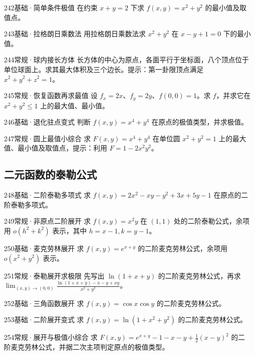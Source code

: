 \begin{exercise}{242}{基础·简单条件极值}
在约束 $x+y=2$ 下求 $f(x,y)=x^2+y^2$ 的最小值及取值点。
\end{exercise}
\begin{exercise}{243}{基础·拉格朗日乘数法}
用拉格朗日乘数法求 $x^2+y^2$ 在 $x-y+1=0$ 下的最小值。
\end{exercise}
\begin{exercise}{244}{常规·球内接长方体}
长方体的中心为原点，各面平行于坐标面，八个顶点位于单位球面上。求其最大体积及三个边长。提示：第一卦限顶点满足 $x^2+y^2+z^2=1$。
\end{exercise}
\begin{exercise}{245}{常规·恢复函数再求最值}
设 $f_x=2x$、$f_y=2y$、$f(0,0)=1$。求 $f$，并求它在 $x^2+y^2\le1$ 上的最大值、最小值。
\end{exercise}
\begin{exercise}{246}{基础·退化驻点变式}
判断 $f(x,y)=x^4+y^4$ 在原点的极值类型，并求极值。
\end{exercise}
\begin{exercise}{247}{常规·圆上最值小综合}
求 $F(x,y)=x^4+y^4$ 在单位圆 $x^2+y^2=1$ 上的最大值、最小值及取值点，提示：利用 $F=1-2x^2y^2$。
\end{exercise}
\subsection{二元函数的泰勒公式}
\begin{exercise}{248}{基础·二阶泰勒多项式}
求 $f(x,y)=2x^2-xy-y^2+3x+5y-1$ 在原点的二阶泰勒多项式。
\end{exercise}
\begin{exercise}{249}{常规·非原点二阶展开}
求 $f(x,y)=x^2y$ 在 $(1,1)$ 处的二阶泰勒公式，余项用 $o(h^2+k^2)$ 表示，其中 $h=x-1,k=y-1$。
\end{exercise}
\begin{exercise}{250}{基础·麦克劳林展开}
求 $f(x,y)=e^{x+y}$ 的二阶麦克劳林公式，余项用 $o(x^2+y^2)$ 表示。
\end{exercise}
\begin{exercise}{251}{常规·泰勒展开求极限}
先写出 $\ln(1+x+y)$ 的二阶麦克劳林公式，再求 $\lim_{(x,y)\to(0,0)}\frac{\ln(1+x+y)-x-y+xy}{x^2+y^2}$。
\end{exercise}
\begin{exercise}{252}{基础·三角函数展开}
求 $f(x,y)=\cos x\cos y$ 的二阶麦克劳林公式。
\end{exercise}
\begin{exercise}{253}{基础·二阶展开变式}
求 $f(x,y)=\ln(1+x^2+y^2)$ 的二阶麦克劳林公式。
\end{exercise}
\begin{exercise}{254}{常规·展开与极值小综合}
求 $F(x,y)=e^{x+y}-1-x-y+\frac12(x-y)^2$ 的二阶麦克劳林公式，并据二次主项判定原点的极值类型。
\end{exercise}
